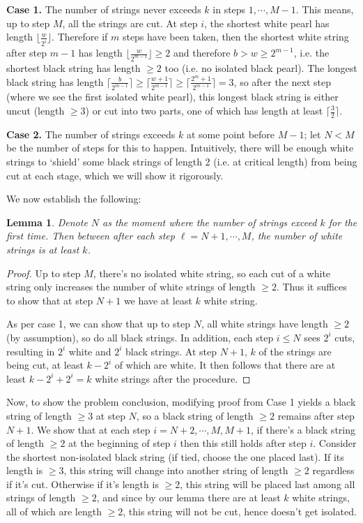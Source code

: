 \documentclass[11pt]{article}
\newcommand{\<}{\langle}
\renewcommand{\>}{\rangle}
\newtheorem{lemma}{Lemma}
\begin{document}
\begin{enumerate}
	\textbf{Case 1.} 
	The number of strings never exceeds $k$ in steps $1, \cdots, M-1$. 
	This means, up to step $M$, all the strings are cut. 
	At step $i$, the shortest white pearl has length $\lfloor \frac{w}{2^i}\rfloor$. Therefore if $m$ steps have been taken, then the shortest white string after step $m-1$ has length $\lfloor \frac{w}{2^{m-1}}\rfloor\ge 2$ and therefore $b > w\ge 2^{m-1}$, 
	i.e. the shortest black string has length $\ge 2$ too (i.e. no isolated black pearl). 
	The longest black string has length 
	$\lceil \frac{b}{2^{m-1}}\rceil\ge \lceil \frac{w+1}{2^{m-1}}\rceil\ge \lceil \frac{2^m+1}{2^{m-1}}\rceil=3$, 
	so after the next step (where we see the first isolated white pearl), 
	this longest black string is either uncut (length $\ge 3$)
	or cut into two parts, one of which has length at least $\lceil \frac{3}{2}\rceil$. 
	
	\textbf{Case 2.} 
	The number of strings exceeds $k$ at some point before $M - 1$; let $N < M$ be the number of steps for this to happen. 
	Intuitively, there will be enough white strings to `shield' some black strings of length 2 (i.e. at critical length) from being cut at each stage, which we will show it rigorously. 
	
	We now establish the following: 
	\begin{lemma}
		Denote $N$ as the moment where the number of strings exceed $k$ for the first time. 
		Then between after each step $\ell=N+1, \cdots, M$, the number of white strings is at least $k$. 
	\end{lemma}
    \begin{proof}
    	Up to step $M$, there's no isolated white string, so each cut of a white string only increases the number of white strings of length $\ge 2$. 
    	Thus it suffices to show that at step $N + 1$ we have at least $k$ white string. 
    	
    	As per case 1, we can show that up to step $N$, all white strings have length $\ge 2$ (by assumption), 
    	so do all black strings. 
    	In addition, each step $i\le N$ sees $2^i$ cuts, resulting in $2^i$ white and $2^i$ black strings. 
    	At step $N + 1$, $k$ of the strings are being cut, at least $k-2^i$ of which are white. 
    	It then follows that there are at least $k-2^i+2^i=k$ white strings after the procedure. 
    \end{proof}
    
    Now, to show the problem conclusion, modifying proof from Case 1 yields a black string of length $\ge 3$ at step $N$, 
    so a black string of length $\ge 2$ remains after step $N + 1$. 
    We show that at each step $i=N+2, \cdots, M, M+1$, if there's a black string of length $\ge 2$ at the beginning of step $i$ then this still holds after step $i$. 
    Consider the shortest non-isolated black string (if tied, choose the one placed last). 
    If its length is $\ge 3$, this string will change into another string of length $\ge 2$ regardless if it's cut. 
    Otherwise if it's length is $\ge 2$, this string will be placed last among all strings of length $\ge 2$, 
    and since by our lemma there are at least $k$ white strings, all of which are length $\ge 2$, 
    this string will not be cut, 
    hence doesn't get isolated. 
	

\end{enumerate}
\end{document}
